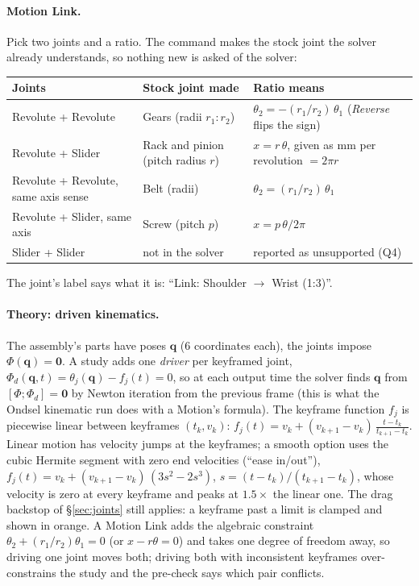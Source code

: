 \paragraph{Motion Link.} Pick two joints and a ratio. The command makes the stock joint the solver already
understands, so nothing new is asked of the solver:
\begin{center}
\small
\begin{tabular}{@{}lll@{}}
\toprule
Joints & Stock joint made & Ratio means\\
\midrule
Revolute + Revolute & Gears (radii $r_1:r_2$) & $\theta_2=-(r_1/r_2)\,\theta_1$ (\emph{Reverse} flips the sign)\\
Revolute + Slider & Rack and pinion (pitch radius $r$) & $x=r\,\theta$, given as mm per revolution $=2\pi r$\\
Revolute + Revolute, same axis sense & Belt (radii) & $\theta_2=(r_1/r_2)\,\theta_1$\\
Revolute + Slider, same axis & Screw (pitch $p$) & $x=p\,\theta/2\pi$\\
Slider + Slider & not in the solver & reported as unsupported (Q4)\\
\bottomrule
\end{tabular}
\end{center}
The joint's label says what it is: ``Link: Shoulder $\to$ Wrist (1:3)''.

\paragraph{Theory: driven kinematics.} The assembly's parts have poses $\mathbf q$ (6 coordinates each), the
joints impose $\Phi(\mathbf q)=\mathbf 0$. A study adds one \emph{driver} per keyframed joint,
$\Phi_d(\mathbf q,t)=\theta_j(\mathbf q)-f_j(t)=0$, so at each output time the solver finds $\mathbf q$ from
$[\Phi;\Phi_d]=\mathbf 0$ by Newton iteration from the previous frame (this is what the Ondsel kinematic run
does with a Motion's formula). The keyframe function $f_j$ is piecewise linear between keyframes
$(t_k,v_k)$: $f_j(t)=v_k+(v_{k+1}-v_k)\,\frac{t-t_k}{t_{k+1}-t_k}$. Linear motion has velocity jumps at the
keyframes; a smooth option uses the cubic Hermite segment with zero end velocities (``ease in/out''),
$f_j(t)=v_k+(v_{k+1}-v_k)\,(3s^2-2s^3)$, $s=(t-t_k)/(t_{k+1}-t_k)$, whose velocity is zero at every keyframe and
peaks at $1.5\times$ the linear one. The drag backstop of \S\ref{sec:joints} still applies: a keyframe past a limit
is clamped and shown in orange. A Motion Link adds the algebraic constraint $\theta_2+(r_1/r_2)\theta_1=0$ (or
$x-r\theta=0$) and takes one degree of freedom away, so driving one joint moves both; driving both with
inconsistent keyframes over-constrains the study and the pre-check says which pair conflicts.

